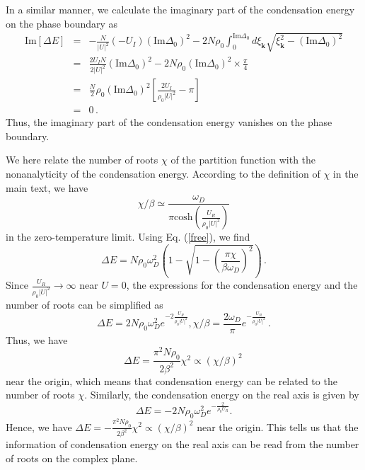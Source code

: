 \documentclass[aps,prl,twocolumn,superscriptaddress]{revtex4-1}
\begin{document}
\begin{bibunit}
In a similar manner, we calculate the imaginary part of the condensation energy on the phase boundary as
\begin{eqnarray}
	\text{Im} [\Delta E] & = & - \frac{N}{| U |^2} \left( - U_I \right)
	\left( \text{Im} \Delta_0 \right)^2 - 2 N \rho_0 \int_0^{\text{Im} \Delta_0}
	d \xi_{\bm{k}} \sqrt{\xi_{\bm{k}}^2 - \left(\text{Im} \Delta_0\right)^2} \nonumber\\
	& = & \frac{2U_I N}{2 | U |^2} \left( \text{Im} \Delta_0 \right)^2 - 2 N
	\rho_0 \left( \text{Im} \Delta_0 \right)^2 \times \frac{\pi}{4} \nonumber\\
	& = & \frac{N}{2} \rho_0 \left( \text{Im} \Delta_0 \right)^2 \left[
	\frac{2U_I}{\rho_0 | U |^2} - \pi \right] \nonumber\\
	& = & 0 \,.
\end{eqnarray}
Thus, the imaginary part of the condensation energy vanishes on the phase boundary. 

We here relate the number of roots $\chi$ of the partition function with the nonanalyticity of the condensation energy. According to the definition of $\chi$ in the main text, we have
\begin{equation}
	\chi / \beta \simeq\frac{\omega_D}{\pi\text{cosh}(\frac{U_R}{\rho_0|U|^2})}
\end{equation}
in the zero-temperature limit. Using Eq. (\ref{free}), we find
\begin{equation}
	\Delta E=N\rho_0\omega_D^2(1-\sqrt{1-(\frac{\pi\chi}{\beta\omega_D})^2})\,.
\end{equation}
Since $\frac{U_R}{\rho_0|U|^2}\rightarrow\infty$ near $U=0$, the expressions for the condensation energy and the number of roots can be simplified as
\begin{equation}
	\Delta E=2N \rho_0 \omega_D^2 e^{-2\frac{U_R}{\rho_0|U|^2}},\chi/\beta=\frac{2\omega_D}{\pi}e^{-\frac{U_R}{\rho_0|U|^2}}\,.
\end{equation}
Thus, we have
\begin{equation}
	\Delta E=\frac{\pi^2N\rho_0}{2\beta^2}\chi^2\propto(\chi/\beta)^2\,
\end{equation}
near the origin, which means that condensation energy can be related to the number of roots $\chi$. Similarly, the condensation energy on the real axis is given by
\begin{equation}
	\Delta E=-2N \rho_0 \omega_D^2 e^{-\frac{2}{\rho_0 U_R}}.
\end{equation}
Hence, we have $\Delta E=-\frac{\pi^2N\rho_0}{2\beta^2}\chi^2\propto(\chi/\beta)^2$ near the origin. This tells us that the information of condensation energy on the real axis can be read from the number of roots on the complex plane.


\end{bibunit}
\end{document}
